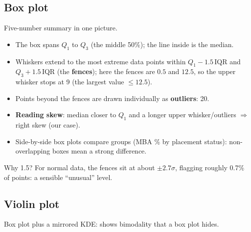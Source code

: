 \subsection{Box plot}
Five-number summary in one picture.
\begin{center}
\end{center}
\begin{itemize}
\item The box spans $Q_1$ to $Q_3$ (the middle 50\%); the line inside is the median.
\item Whiskers extend to the most extreme data points within $Q_1 - 1.5\,\text{IQR}$ and $Q_3 + 1.5\,\text{IQR}$ (the \textbf{fences}); here the fences are
  $0.5$ and $12.5$, so the upper whisker stops at 9 (the largest value $\le12.5$).
\item Points beyond the fences are drawn individually as \textbf{outliers}: 20.
\item \textbf{Reading skew}: median closer to $Q_1$ and a longer upper whisker/outliers $\Rightarrow$ right skew (our case).
\item Side-by-side box plots compare groups (MBA \% by placement status): non-overlapping boxes mean a strong difference.
\end{itemize}
Why 1.5? For normal data, the fences sit at about $\pm2.7\sigma$, flagging roughly 0.7\% of points: a sensible ``unusual'' level.

\subsection{Violin plot}
Box plot plus a mirrored KDE: shows bimodality that a box plot hides.

